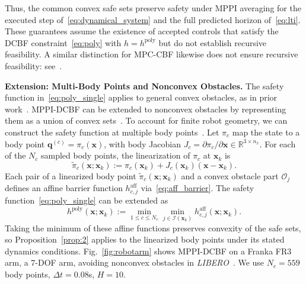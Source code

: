 \documentclass[letterpaper, 10 pt, conference]{ieeeconf}
\newcommand{\q}{\mathbf{q}}
\newcommand{\x}{\mathbf{x}}
\newcommand{\xk}{\mathbf{x}_{k}}
\begin{document}
Thus, the common convex safe sets preserve safety under MPPI averaging for the executed step of~\eqref{eq:dynamical_system} and the full predicted horizon of~\eqref{eq:lti}. These guarantees assume the existence of accepted controls that satisfy the DCBF constraint~\eqref{eq:poly} with $h=h^\text{poly}$ but do not establish recursive feasibility. A similar distinction for MPC-CBF likewise does not ensure recursive feasibility: see~\cite[Remark~1]{zeng2021enhancing}.

\noindent\textbf{Extension: Multi-Body Points and Nonconvex Obstacles.} The safety function in~\eqref{eq:poly_single} applies to general convex obstacles, as in prior work~\cite{agrawal2017discrete, mizuta2025unified}.
MPPI-DCBF can be extended to nonconvex obstacles by representing them as a union of convex sets~\cite{zhang2020optimization,mjx}.
To account for finite robot geometry, we can construct the safety function at multiple body points~\cite{wilkinson2026full}. Let $\pi_c$ map the state to a body point \(\q^{(c)}\!=\!\pi_c(\x)\), with body Jacobian \(J_c\!=\!\partial \pi_c/\partial \x \!\in\! \mathbb R^{3\times n_x}\). For each of the $N_c$ sampled body points, the linearization of $\pi_c$ at $\xk$ is
\begin{equation}
\tilde{\pi}_c(\x;\xk)
:=\pi_c(\xk)+J_c(\xk)(\x-\xk).
\end{equation}
Each pair of a linearized body point $\tilde{\pi}_c(\x;\xk)$ and a convex obstacle part $\mathcal O_j$ defines an affine barrier function $h^{\mathrm{aff}}_{c,j}$ via~\eqref{eq:aff_barrier}. The safety function~\eqref{eq:poly_single} can be extended as
\begin{equation}
h^{\mathrm{poly}}(\x;\xk)
:=\min_{1\le c\le N_c}\min_{j\in\mathcal I(\xk)}
h^{\mathrm{aff}}_{c,j}(\x;\xk).
\label{eq:poly_multi}
\end{equation}
Taking the minimum of these affine functions preserves convexity of the safe sets, so Proposition~\ref{prop:2} applies to the linearized body points under its stated dynamics conditions. 
Fig.~\ref{fig:robotarm} shows MPPI-DCBF on a Franka FR3 arm, a 7-DOF arm, avoiding nonconvex obstacles in \emph{LIBERO}~\cite{liu2023libero}.
We use $N_c=559$ body points, $\Delta t=0.08$s, $H=10$. 
\end{document}
